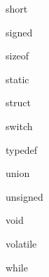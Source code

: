  			\begin{minipage}[c]{2.2 cm}
	 			\begin{compactitem}		 
	 			 	\item short 			 	
	 			 	\item signed 			 	
	 			 	\item sizeof 			 	
	 			 	\item static	
	 			\end{compactitem}
	 		\end{minipage}
 			\begin{minipage}[c]{2.2 cm}
	 			\begin{compactitem}		 	
	 			 	\item struct 		 	
	 			 	\item switch 			 	
	 			 	\item typedef 			 	
	 			 	\item union 			 	
	 			\end{compactitem}
	 		\end{minipage}
 			\begin{minipage}[c]{2.3 cm}
	 			\begin{compactitem}		 	
	 			 	\item unsigned 			 	
	 			 	\item void 	
	 			 	\item volatile		 	
	 			 	\item while
	 			\end{compactitem}
	 		\end{minipage}
	 		
